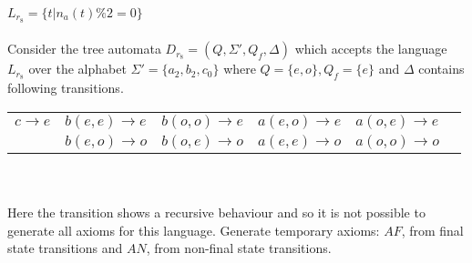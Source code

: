 \begin{example}
                     $L_{r_{8}}=\{t|n_a(t)\%2= 0\}$\\\\ 
Consider the tree automata $D_{r_{8}}=(Q,\Sigma ',Q_f, \Delta)$ which accepts the language $L_{r_{8}}$ over the alphabet 
$\Sigma '=\{a_2,b_2,c_0\}$ 
where $Q=\{e,o\},Q_f=\{e\}$ and $\Delta$ contains following transitions.\\

\begin{tabular}{llllll}
$c\rightarrow e$ & $ b(e,e) \rightarrow e$ & $ b(o,o) \rightarrow e$ & $a(e,o) \rightarrow e$ & 
$a(o,e) \rightarrow e$\\
&$b(e,o) \rightarrow o$ & $ b(o,e) \rightarrow o$ & $ a(e,e) \rightarrow o$ & $a(o,o) \rightarrow o$\\ 
\end{tabular}\\\\

Here the transition shows a recursive behaviour and so it is not possible to generate all axioms for this language.
Generate  temporary axioms: $AF$, from final state transitions and $AN$, from non-final state transitions.


\end{example}
